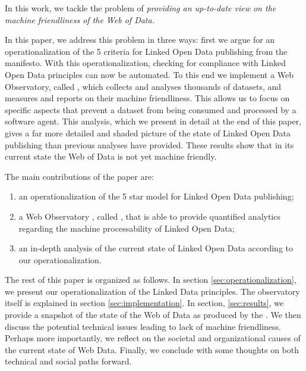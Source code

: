 In this work, we tackle the problem of
 {\em providing an up-to-date view on the machine friendliness of the Web of Data.}

In this paper, we address this problem in three ways:
 first we argue for an operationalization of the 5 criteria
 for Linked Open Data publishing from the manifesto.
With this operationalization, checking for compliance with
 Linked Open Data principles can now be automated.
To this end we implement a Web Observatory, called \obs,
 which collects and analyses thousands of datasets,
 and measures and reports on their machine friendliness.
This allows us to focus on specific aspects that prevent a dataset
 from being consumed and processed by a software agent.
This analysis, which we present in detail at the end of this paper,
 gives a far more detailed and shaded picture of the state of
 Linked Open Data publishing than previous analyses have provided.
These results show that in its current state the Web of Data is not yet
 machine friendly.

The main contributions of the paper are: 
\begin{enumerate}
\item an operationalization of the 5 star model for
       Linked Open Data publishing;
\item a Web Observatory , called \obs,
       that is able to provide quantified analytics
       regarding the machine processability of Linked Open Data;
\item an in-depth analysis of the current state of Linked Open Data
       according to our operationalization.
\end{enumerate}

The rest of this paper is organized as follows.
In section \ref{sec:operationalization}, we present our operationalization of
 the Linked Data principles.
The observatory itself is explained in section \ref{sec:implementation}.
In section, \ref{sec:results}, we provide a snapshot of
 the state of the Web of Data as produced by the \obs.
We then discuss the potential technical issues leading to
 lack of machine friendliness.
Perhaps more importantly, we reflect on
 the societal and organizational causes of the current state of Web Data.
Finally, we conclude with some thoughts on both technical and social paths
 forward.


